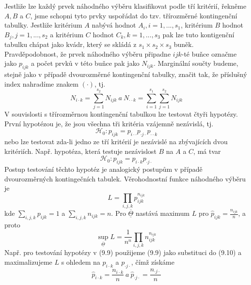 Jestliže lze každý prvek náhodného výběru klasifikovat podle tří kritérií, řekněme $A, B$ a $C$, jsme schopni tyto prvky uspořádat do tzv. třírozměrné kontingenční tabulky. Jestliže kritérium $A$ nabývá hodnot $A_i, i = 1, ..., s_1$, kritérium $B$ hodnot $B_j, j = 1, ..., s_2$ a kritérium $C$ hodnot $C_k, k = 1, ..., s_3$ pak lze tuto kontigenční tabulku chápat jako kvádr, který se skládá z $s_1 \times s_2 \times s_3$ buněk. Pravděpodobnost, že prvek náhodného výběru připadne $ijk$-té buňce označme jako $p_{ijk}$ a počet prvků v této buňce pak jako $N_{ijk}$. Marginální součty budeme, stejně jako v případě dvourozměrné kontingenční tabulky, značit tak, že příslušný index nahradíme znakem $(\cdot)$, tj.
\begin{equation*}
N_{i \cdot k} = \sum_{j = 1}^{s_2}N_{ijk} ~ \textit{a} ~ N_{\cdot \cdot k} = \sum_{i = 1}^{s_1} \sum_{j = 1}^{s_2}N_{ijk}
\end{equation*}
V souvislosti s třírozměrnou kontingenční tabulkou lze testovat čtyři hypotézy. První hypotézou je, že jsou všechna tři kritéria vzájemně nezávislá, tj.
\begin{equation}
\mathscr{H}_0: p_{ijk} = p_{i \cdot \cdot} p_{\cdot j \cdot}  p_{\cdot \cdot k}
\end{equation}
nebo lze testovat zda-li jedno ze tří kritérií je nezávislé na zbývajících dvou kritériích. Např. hypotéza, která testuje nezávislost $B$ na $A$ a $C$, má tvar
\begin{equation}
\mathscr{H}_0: p_{ijk} = p_{i \cdot k} p_{\cdot j \cdot}
\end{equation}
Postup testování těchto hypotéz je analogický postupům v případě dvourozměrných kontingečních tabulek. Věrohodnostní funkce náhodného výběru je
\begin{equation}
L = \prod_{i,j,k} p_{ijk}^{n_{ijk}}
\end{equation}
kde $\sum_{i,j,k} p_{ijk} = 1$ a $\sum_{i,j,k} n_{ijk} = n$. Pro $\overline{\underline{\Theta}}$ nastává maximum $L$ pro $\hat{p}_{ijk} = \frac{n_{ijk}}{n}$, a proto
\begin{equation}
\sup_{\overline{\underline{\Theta}}} L = \frac{1}{n^n}\prod_{i,j,k}n_{ijk}^{n_{ijk}}
\end{equation}
Např. pro testování hypotézy v (9.9) použijeme (9.9) jako substituci do (9.10) a maximalizujeme $L$ s ohledem na $p_{i \cdot k}$ a $p_{\cdot j \cdot}$, čímž získáme
\begin{equation*}
\hat{p}_{i \cdot k} = \frac{n_{i \cdot k}}{n} ~ \textit{a} ~ \hat{p}_{\cdot j \cdot} = \frac{n_{\cdot j \cdot}}{n}
\end{equation*}

